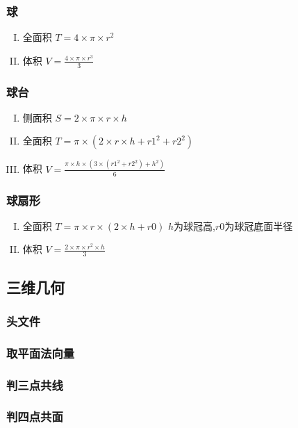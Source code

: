 \subsubsection{球}
\begin{enumerate}[I. ]
	\item 全面积 $T=4\times \pi \times r^{2}$
	\item 体积 $V=\frac{4\times \pi\times r^{3}}{3}$
\end{enumerate}
\subsubsection{球台}
\begin{enumerate}[I. ]
	\item 侧面积 $S=2\times \pi\times r\times h$
	\item 全面积 $T=\pi\times (2\times r\times h+r1^{2}+r2^{2})$
	\item 体积 $V=\frac{\pi\times h\times (3\times (r1^{2}+r2^{2})+h^{2})}{6}$
\end{enumerate}
\subsubsection{球扇形}
\begin{enumerate}[I. ]
	\item 全面积 $T=\pi\times r\times (2\times h+r0)$ $h$为球冠高,$r0$为球冠底面半径
	\item 体积 $V=\frac{2\times \pi\times r^{2}\times h}{3}$
\end{enumerate}


\subsection{三维几何}
\subsubsection{头文件}

\subsubsection{取平面法向量}

\subsubsection{判三点共线}

\subsubsection{判四点共面}

